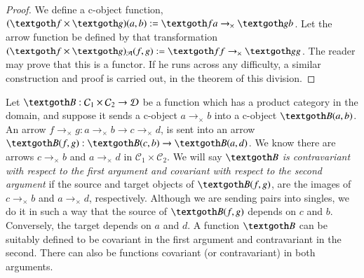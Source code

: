 \documentclass [12pt]{book}
\begin{document}
\begin{proof}We define a c-object function, $(\textgoth f\times\textgoth g)(a,b):=\textgoth fa\rightarrow_\times\textgoth gb$. Let the arrow function be defined by that transformation $(\textgoth f\times\textgoth g)_\mathcal A(f,g):=\textgoth ff\rightarrow_\times\textgoth gg$. The reader may prove that this is a functor. If he runs across any difficulty, a similar construction and proof is carried out, in the theorem of this division.\end{proof}

Let $\textgoth B:\mathcal C_1\times\mathcal C_2\rightarrow\mathcal D$ be a function which has a product category in the domain, and suppose it sends a c-object $a\rightarrow_\times b$ into a c-object $\textgoth B(a,b)$. An arrow $f\rightarrow_\times g:a\rightarrow_\times b\longrightarrow c\rightarrow_\times d$, is sent into an arrow $\textgoth B(f,g):\textgoth B(c,b)\rightarrow\textgoth B(a,d)$. We know there are arrows $c\rightarrow_\times b$ and $a\rightarrow_\times d$ in $\mathcal C_1\times\mathcal C_2$. We will say \textit{$\textgoth B$ is contravariant with respect to the first argument and covariant with respect to the second argument} if the source and target objects of $\textgoth B(f,g)$, are the images of $c\rightarrow_\times b$ and $a\rightarrow_\times d$, respectively. Although we are sending pairs into singles, we do it in such a way that the source of $\textgoth B(f,g)$ depends on $c$ and $b$. Conversely, the target depends on $a$ and $d$. A function $\textgoth B$ can be suitably defined to be covariant in the first argument and contravariant in the second. There can also be functions covariant (or contravariant) in both arguments.
\end{document}
